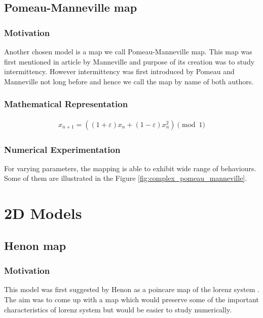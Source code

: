 \subsection{Pomeau-Manneville map}

\subsubsection{Motivation}
Another chosen model is a map we call Pomeau-Manneville map.
This map was first mentioned in article by Manneville \cite{Manneville1980} and purpose of its creation was to study intermittency.
However intermittency was first introduced by Pomeau and Manneville \cite{Pomeau1980} not long before \cite{Manneville1980} and hence we call the map by name of both authors.

\subsubsection{Mathematical Representation}

\begin{align}
    x_{n+1} = ((1 + \varepsilon) x_{n} + (1 - \varepsilon) x_{n}^2) \pmod{1}
\end{align}

\subsubsection{Numerical Experimentation}
For varying parameters, the mapping is able to exhibit wide range of behaviours.
Some of them are illustrated in the Figure \ref{fig:complex_pomeau_manneville}.

\section{2D Models}

\subsection{Henon map}

\subsubsection{Motivation}

This model was first suggested by Henon \cite{Henon1976} as a poincare map of the lorenz system \cite{Lorenz2004}.
The aim was to come up with a map which would preserve some of the important characteristics of lorenz system but would be easier to study numerically.

